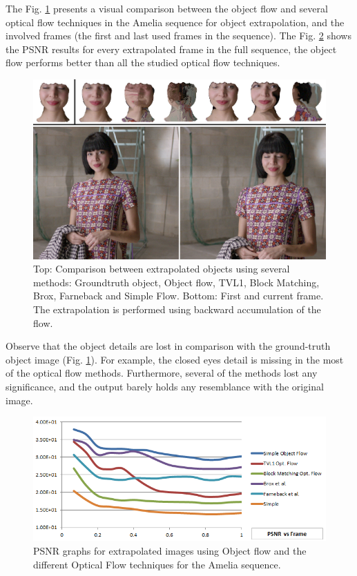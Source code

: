 The Fig. \ref{compare2} presents a visual comparison between the object flow and several optical flow techniques in the Amelia sequence for object extrapolation, and the involved frames (the first and last used frames in the sequence). The Fig. \ref{of_res2} shows the PSNR results for every extrapolated frame in the full sequence, the object flow performs better 
than all the studied optical flow techniques.

   \begin{figure}[t]
      \centering
      \includegraphics[width=1.0\textwidth]{../images/compare2.png}
      \caption{Top: Comparison between extrapolated objects using several methods: Groundtruth object, Object flow, TVL1, Block Matching, Brox, Farneback and Simple Flow. 
		Bottom: First and current frame. The extrapolation is performed using backward accumulation of the flow.}
      \label{compare2}
   \end{figure}
	\setlength{\belowcaptionskip}{-10pt}

Observe that the object details are lost in comparison with the ground-truth object image (Fig. \ref{compare2}). For example, the closed eyes detail is missing in the most of the optical 
flow methods. Furthermore, several of the methods lost any significance, and the output barely holds any resemblance with the original image.

   \begin{figure}[th]
      \centering
      \includegraphics[width=1.0\textwidth]{../images/psnr2.png}
      \caption{PSNR graphs for extrapolated images using Object flow and the different Optical Flow techniques for the Amelia sequence. }
      \label{of_res2}
   \end{figure}
	\setlength{\belowcaptionskip}{-10pt}

